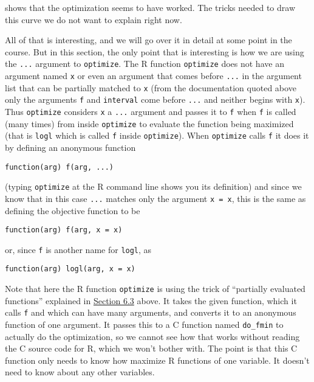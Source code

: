 \documentclass[
]{article}
\begin{document}
shows that the optimization seems to have worked. The tricks needed to
draw this curve we do not want to explain right now.

All of that is interesting, and we will go over it in detail at some
point in the course. But in this section, the only point that is
interesting is how we are using the \texttt{...} argument to
\texttt{optimize}. The R function \texttt{optimize} does not have an
argument named \texttt{x} or even an argument that comes before
\texttt{...} in the argument list that can be partially matched to
\texttt{x} (from the documentation quoted above only the arguments
\texttt{f} and \texttt{interval} come before \texttt{...} and neither
begins with \texttt{x}). Thus \texttt{optimize} considers \texttt{x} a
\texttt{...} argument and passes it to \texttt{f} when \texttt{f} is
called (many times) from inside \texttt{optimize} to evaluate the
function being maximized (that is \texttt{logl} which is called
\texttt{f} inside \texttt{optimize}). When \texttt{optimize} calls
\texttt{f} it does it by defining an anonymous function

\begin{verbatim}
function(arg) f(arg, ...)
\end{verbatim}

(typing \texttt{optimize} at the R command line shows you its
definition) and since we know that in this case \texttt{...} matches
only the argument \texttt{x\ =\ x}, this is the same as defining the
objective function to be

\begin{verbatim}
function(arg) f(arg, x = x)
\end{verbatim}

or, since \texttt{f} is another name for \texttt{logl}, as

\begin{verbatim}
function(arg) logl(arg, x = x)
\end{verbatim}

Note that here the R function \texttt{optimize} is using the trick of
``partially evaluated functions'' explained in
\protect\hyperlink{partially-evaluated-functions}{Section 6.3} above. It
takes the given function, which it calls \texttt{f} and which can have
many arguments, and converts it to an anonymous function of one
argument. It passes this to a C function named \texttt{do\_fmin} to
actually do the optimization, so we cannot see how that works without
reading the C source code for R, which we won't bother with. The point
is that this C function only needs to know how maximize R functions of
one variable. It doesn't need to know about any other variables.
\end{document}

